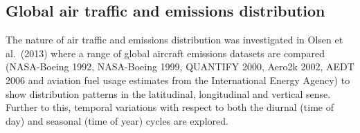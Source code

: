 






\subsection{Global air traffic and emissions distribution}
The nature of air traffic and emissions distribution was investigated in Olsen et al.\ (2013) \cite{Olsen2013} where a range of global aircraft emissions datasets are compared (NASA-Boeing 1992, NASA-Boeing 1999, QUANTIFY 2000, Aero2k 2002, AEDT 2006 and aviation fuel usage estimates from the International Energy Agency) to show distribution patterns in the latitudinal, longitudinal and vertical sense. Further to this, temporal variations with respect to both the diurnal (time of day) and seasonal (time of year) cycles are explored.

